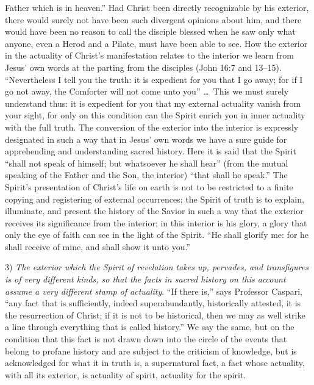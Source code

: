 \documentclass[12pt]{book}
\newcommand{\opage}[1]{\marginnote{\footnotesize\textit{[#1]}}}
\begin{document}
Father which is in heaven.'' Had Christ been directly recognizable by his
exterior, there would surely not have been such divergent opinions about
him, and there would have been no reason to call the disciple blessed
when he saw only what anyone, even a Herod and a Pilate, must have been
able to see. How the exterior in the actuality of Christ's manifestation
relates to the interior we learn from Jesus' own words at the parting
from the disciples (John 16:7 and 13--15). ``Nevertheless I tell you the
truth: it is expedient for you that I go away; for if I go not away, the
Comforter will not come unto you'' \ldots\ This we must surely understand
thus: it is expedient for you that my external actuality
\opage{306}\setcounter{footnote}{0}%
vanish from your sight, for only on this condition can the Spirit enrich
you in inner actuality with the full truth. The conversion of the exterior
into the interior is expressly designated in such a way that in Jesus' own
words we have a sure guide for apprehending and understanding sacred
history. Here it is said that the Spirit ``shall not speak of himself; but
whatsoever he shall hear'' (from the mutual speaking of the Father and the
Son, the interior) ``that shall he speak.'' The Spirit's presentation of
Christ's life on earth is not to be restricted to a finite copying and
registering of external occurrences; the Spirit of truth is to explain,
illuminate, and present the history of the Savior in such a way that the
exterior receives its significance from the interior; in this interior is
his glory, a glory that only the eye of faith can see in the light of the
Spirit. ``He shall glorify me: for he shall receive of mine, and shall
show it unto you.''

3) \emph{The exterior which the Spirit of revelation takes up, pervades,
and transfigures is of very different kinds, so that the facts in sacred
history on this account assume a very different stamp of actuality}. ``If
there is,'' says Professor Caspari, ``any fact that is sufficiently, indeed
superabundantly, historically attested, it is the resurrection of Christ;
if it is not to be historical, then we may as well strike a line through
everything that is called history.'' We say the same, but on the condition
that this fact is not drawn down into the circle of the events that belong
to profane history and are subject to the criticism of knowledge, but is
acknowledged for what it in truth is, a supernatural fact, a fact whose
actuality, with all its exterior, is actuality of spirit, actuality for
the spirit.
\end{document}
